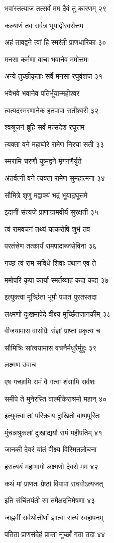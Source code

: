भवांस्तत्याज तत्सर्वं मम दैवं तु कारणम् २९

कल्याणं तव सर्वत्र भूयाद्वीरवरोत्तम

अहं तावद्वने त्वां हि स्मरंती प्राणधारिका ३०

मनसा कर्मणा वाचा भवानेव ममोत्तमः

अन्ये तुच्छीकृताः सर्वे मनसा रघुवंशज ३१

भवेभवे भवानेव पतिर्भूयान्महीश्वर

त्वत्पदस्मरणानेक हतपापा सतीश्वरी ३२

श्वश्रूजनं ब्रूहि सर्वं मत्संदेशं रघूत्तम

त्यक्ता वने महाघोरे रामेण निरघा सती ३३

स्मरामि चरणौ युष्मद्वने मृगगणैर्युते

अंतर्वत्नी वने त्यक्ता रामेण सुमहात्मना ३४

सौमित्रे शृणु मद्वाक्यं भद्रं भूयाद्रघूत्तमे

इदानीं संत्यजे प्राणान्रामवीर्यं सुरक्षती ३५

त्वं रामवचनं तथ्यं यत्करोषि शुभं तव

परतंत्त्रेण तत्कार्यं रामपादाब्जसेविना ३६

गच्छ त्वं राम सविधे शिवाः पंथान एव ते

ममोपरि कृपा कार्या स्मर्तव्याहं कदा कदा ३७

इत्युक्त्वा मूर्च्छिता भूमौ पपात पुरतस्तदा

लक्ष्मणो दुःखमापेदे वीक्ष्य मूर्च्छितजानकीम् ३८

वीजयामास वासोग्रैः संज्ञां प्राप्तां प्रकृत्य च

सौमित्रिः सांत्वयामास वचनैर्मधुरैर्मुहुः ३९

लक्ष्मण उवाच

एष गच्छामि रामं वै गत्वा शंसामि सर्वशः

समीपे ते मुनेरस्ति वाल्मीकेराश्रमो महान् ४०

इत्युक्त्वा तां परिक्रम्य दुःखितो बाष्पपूरितः

मुंचन्नश्रुकलां दुःखाद्ययौ रामं महीपतिम् ४१

जानकी देवरं यांतं वीक्ष्य विस्मितलोचना

हसत्ययं महाभागो लक्ष्मणो देवरो मम ४२

कथं मां प्राणतः प्रेष्ठां विपापां राघवोऽत्यजत्

इति संचिंतयंती सा तमैक्षदनिमेषणा ४३

जाह्नवीं सर्वथोत्तीर्णां ज्ञात्वा सत्यं स्वहापनम्

पतिता प्राणसंदेहं प्राप्ता मूर्च्छां गता तदा ४४

